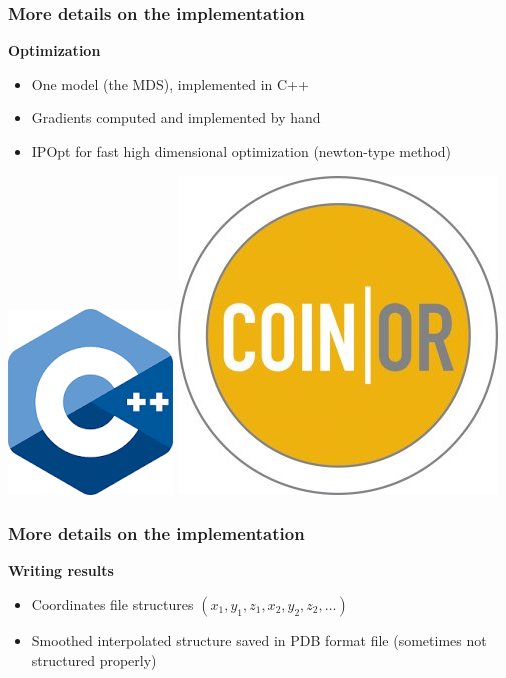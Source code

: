 \documentclass[xcolor=dvipsnames]{beamer}
\begin{document}
\begin{frame}
\frametitle{More details on the implementation}
{\bf \color{Blue} Optimization}
\begin{itemize}[label={$\bullet$}]
\item One model (the MDS), implemented in C++
\item Gradients computed and implemented by hand
\item IPOpt for fast high dimensional optimization (newton-type method)
\end{itemize}

\vspace{3em}
\begin{center}
\centering
\includegraphics[width=0.1\linewidth]{images/cpp.png}
\hspace{3em}
\includegraphics[width=0.1\linewidth]{images/coin_banner.png}
\end{center}
\end{frame}

\begin{frame}
\frametitle{More details on the implementation}


{\bf \color{Blue} Writing results}
\begin{itemize}[label={$\bullet$}]
\item Coordinates file structures $(x_1, y_1, z_1, x_2, y_2, z_2, \dots)$
\item Smoothed interpolated structure saved in PDB format file (sometimes not structured properly)
\end{itemize}
\end{frame}
\end{document}
